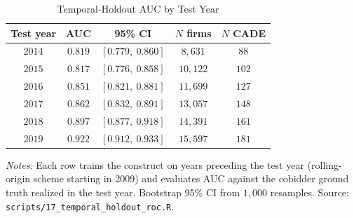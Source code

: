 \begin{table}[htbp]
\centering
\caption{Temporal-Holdout AUC by Test Year}
\label{tab:temporal_holdout_year}
\begin{threeparttable}
\small
\begin{tabular}{ccccc}
\toprule
Test year & AUC & 95\% CI & $N$ firms & $N$ CADE \\
\midrule
$2014$ & $0.819$ & $[0.779,\ 0.860]$ & $8{,}631$ & $88$ \\
$2015$ & $0.817$ & $[0.776,\ 0.858]$ & $10{,}122$ & $102$ \\
$2016$ & $0.851$ & $[0.821,\ 0.881]$ & $11{,}699$ & $127$ \\
$2017$ & $0.862$ & $[0.832,\ 0.891]$ & $13{,}057$ & $148$ \\
$2018$ & $0.897$ & $[0.877,\ 0.918]$ & $14{,}391$ & $161$ \\
$2019$ & $0.922$ & $[0.912,\ 0.933]$ & $15{,}597$ & $181$ \\
\bottomrule
\end{tabular}
\begin{tablenotes}
\small
\item \textit{Notes:} Each row trains the construct on years preceding the test year (rolling-origin scheme starting in 2009) and evaluates AUC against the cobidder ground truth realized in the test year. Bootstrap 95\% CI from $1{,}000$ resamples. Source: \texttt{scripts/17\_temporal\_holdout\_roc.R}.
\end{tablenotes}
\end{threeparttable}
\end{table}
